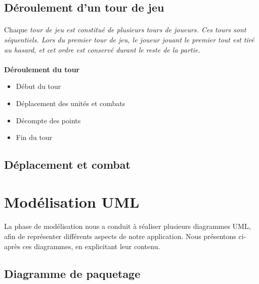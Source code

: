 \documentclass[a4paper]{article}
\begin{document}
\subsection{Déroulement d'un tour de jeu}
\paragraph{}
Chaque \em{tour de jeu} est constitué de plusieurs \em{tours de joueurs}. Ces tours sont séquentiels. Lors du premier tour de jeu, le joueur jouant le premier tout est tiré au hasard, et cet ordre est conservé durant le reste de la partie.
\paragraph{}
\textbf{Déroulement du tour}
\begin{itemize}
    \item Début du tour
    \item Déplacement des unités et combats
    \item Décompte des points
    \item Fin du tour
\end{itemize}

\subsection{Déplacement et combat}


\section{Modélisation UML}
\paragraph{}
La phase de modélisation nous a conduit à réaliser plusieurs diagrammes UML, afin de représenter différents aspects de notre application. Nous présentons ci-après ces diagrammes, en explicitant leur contenu.

\subsection{Diagramme de paquetage}
\end{document}

